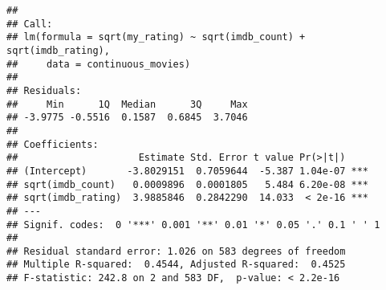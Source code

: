 \documentclass[
]{article}
\begin{document}
\begin{verbatim}
## 
## Call:
## lm(formula = sqrt(my_rating) ~ sqrt(imdb_count) + sqrt(imdb_rating), 
##     data = continuous_movies)
## 
## Residuals:
##     Min      1Q  Median      3Q     Max 
## -3.9775 -0.5516  0.1587  0.6845  3.7046 
## 
## Coefficients:
##                     Estimate Std. Error t value Pr(>|t|)    
## (Intercept)       -3.8029151  0.7059644  -5.387 1.04e-07 ***
## sqrt(imdb_count)   0.0009896  0.0001805   5.484 6.20e-08 ***
## sqrt(imdb_rating)  3.9885846  0.2842290  14.033  < 2e-16 ***
## ---
## Signif. codes:  0 '***' 0.001 '**' 0.01 '*' 0.05 '.' 0.1 ' ' 1
## 
## Residual standard error: 1.026 on 583 degrees of freedom
## Multiple R-squared:  0.4544, Adjusted R-squared:  0.4525 
## F-statistic: 242.8 on 2 and 583 DF,  p-value: < 2.2e-16
\end{verbatim}
\end{document}
